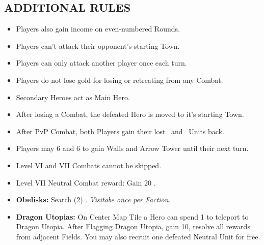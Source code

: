 \begin{multicols}{2}
\subsection*{\MakeUppercase{Additional Rules}}
\begin{itemize}
  \item Players also gain income on even-numbered Rounds.
  \item Players can't attack their opponent's starting Town.
  \item Players can only attack another player once each turn.
  \item Players do not lose gold for losing or retreating from any Combat.
  \item Secondary Heroes act as Main Hero.
  \item After losing a Combat, the defeated Hero is moved to it's starting Town.
  \item After PvP Combat, both Players gain their lost \bronze\ and \silver\ Units back.
  \item Players may  6  and 6  to gain Walls and Arrow Tower until their next turn.
  \item Level VI and VII Combats cannot be skipped.
  \item Level VII Neutral Combat reward: Gain 20 .
  \item \textbf{Obelisks:} Search (2) . \textit{Visitabe once per Faction.}
  \item \textbf{Dragon Utopias:} On Center Map Tile a Hero can spend 1  to teleport to Dragon Utopia. After Flagging Dragon Utopia, gain 10, resolve all rewards from adjacent Fields. You may also recruit one defeated Neutral Unit for free.
\end{itemize}


\end{multicols}
